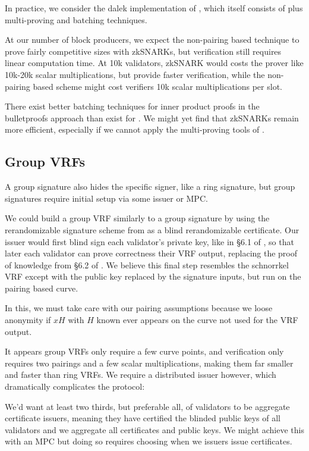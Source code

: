 {In practice, we consider the dalek implementation \cite{dalek_bulletproofs} of \cite{bulletproofs}, which itself consists of \cite{bccgp2016} plus multi-proving and batching techniques.

At our number of block producers, we expect the non-pairing based technique to prove fairly competitive sizes with zkSNARKs, but verification still requires linear computation time.  At 10k validators, zkSNARK would costs the prover like 10k-20k scalar multiplications, but provide faster verification, while the non-pairing based scheme might cost verifiers 10k scalar multiplications per slot.  

There exist better batching techniques for inner product proofs \cite{bccgp2016} in the bulletproofs approach \cite{bulletproofs} than exist for \cite{Groth16}.  We might yet find that zkSNARKs remain more efficient, especially if we cannot apply the multi-proving tools of \cite{bulletproofs}.

\subsection{Group VRFs}

A group signature also hides the specific signer, like a ring signature, but group signatures require initial setup via some issuer or MPC. 

We could build a group VRF similarly to a group signature by using the rerandomizable signature scheme from \cite{PS16} as a blind rerandomizable certificate.  Our issuer would first blind sign each validator's private key, like in \S6.1 of \cite{PS16}, so that later each validator can prove correctness their VRF output, replacing the proof of knowledge from \S6.2 of \cite{PS16}.  We believe this final step resembles the schnorrkel VRF except with the public key replaced by the signature inputs, but run on the pairing based curve.

In this, we must take care with our pairing assumptions because we loose anonymity if $x H$ with $H$ known ever appears on the curve not used for the VRF output.  

It appears group VRFs only require a few curve points, and verification only requires two pairings and a few scalar multiplications, making them far smaller and faster than ring VRFs.  We require a distributed issuer however, which dramatically complicates the protocol:

We'd want at least two thirds, but preferable all, of validators to be aggregate certificate issuers, meaning they have certified the blinded public keys of all validators and we aggregate all certificates and public keys.  We might achieve this with an MPC but doing so requires choosing when we issuers issue certificates.  

}

